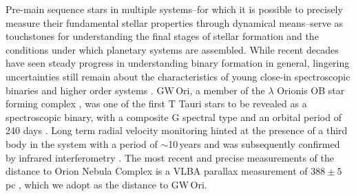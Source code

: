 \documentclass[twocolumn]{aastex61}
\newcommand{\gw}{GW\,Ori}
\begin{document}
Pre-main sequence stars in multiple systems--for which it is possible to precisely measure their fundamental stellar properties through dynamical means--serve as touchstones for understanding the final stages of stellar formation and the conditions under which planetary systems are assembled. While recent decades have seen steady progress in understanding binary formation in general, lingering uncertainties still remain about the characteristics of young close-in spectroscopic binaries and higher order systems \citep{duchene13}.
\gw, a member of the $\lambda$ Orionis OB star forming complex \citep{dolan00,dolan01,dolan02}, was one of the first T Tauri stars to be revealed as a spectroscopic binary, with a composite G spectral type and an orbital period of 240 days \citep{mathieu91}. Long term radial velocity monitoring hinted at the presence of a third body in the system with a period of $\sim$10\,years and was subsequently confirmed by infrared interferometry \citep{berger11}. The most recent and precise measurements of the distance to Orion Nebula Complex is a VLBA parallax measurement of $388\pm5\,$pc \citep{kounkel17}, which we adopt as the distance to \gw.
\end{document}
